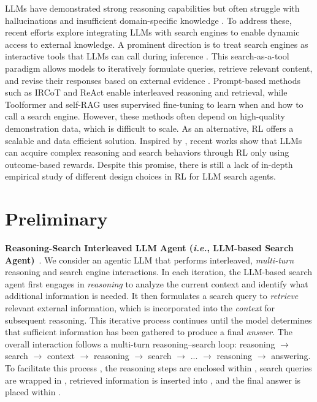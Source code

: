 LLMs \citep{achiam2023gpt,team2024gemini,zhao2023survey} have demonstrated strong reasoning capabilities \citep{guo2025deepseek} but often struggle with hallucinations and insufficient domain-specific knowledge \citep{li2023large,peng2023study}. 
To address these, recent efforts explore integrating LLMs with search engines to enable dynamic access to external knowledge.
A prominent direction is to treat search engines as interactive tools that LLMs can call during inference \citep{schick2023toolformer}. 
This search-as-a-tool paradigm allows models to iteratively formulate queries, retrieve relevant content, and revise their responses based on external evidence \citep{trivedi2022interleaving}.
Prompt-based methods such as IRCoT \citep{trivedi2022interleaving} and ReAct \citep{yao2023react} enable interleaved reasoning and retrieval, while Toolformer \citep{schick2023toolformer} and self-RAG \citep{asai2023self} uses supervised fine-tuning to learn when and how to call a search engine.
However, these methods often depend on high-quality demonstration data, which is difficult to scale. As an alternative, RL offers a scalable and data efficient solution. 
Inspired by \cite{guo2025deepseek}, recent works \citep{chen2025research,jin2025search,song2025r1,zheng2025deepresearcher} show that LLMs can acquire complex reasoning and search behaviors through RL only using outcome-based rewards. 
Despite this promise, there is still a lack of in-depth empirical study of different design choices in RL for LLM search agents.

\section{Preliminary}

\textbf{Reasoning-Search Interleaved LLM Agent (\textit{i.e.}, LLM-based Search Agent)}~\citep{jin2025search,singh2025agentic}.
We consider an agentic LLM that performs interleaved, \textit{multi-turn} reasoning and search engine interactions.
In each iteration, the LLM-based search agent first engages in \textit{reasoning} to analyze the current context and identify what additional information is needed.
It then formulates a search query to \textit{retrieve} relevant external information, which is incorporated into the \textit{context} for subsequent reasoning.
This iterative process continues until the model determines that sufficient information has been gathered to produce a final \textit{answer}.
The overall interaction follows a multi-turn reasoning–search loop:
reasoning $\rightarrow$ search $\rightarrow$ context $\rightarrow$ reasoning $\rightarrow$ search $\rightarrow$ ... $\rightarrow$ reasoning $\rightarrow$ answering.
To facilitate this process \cite{yao2023react}, the reasoning steps are enclosed within \think{}, search queries are wrapped in \search{}, retrieved information is inserted into \info{}, and the final answer is placed within \answer{}.

